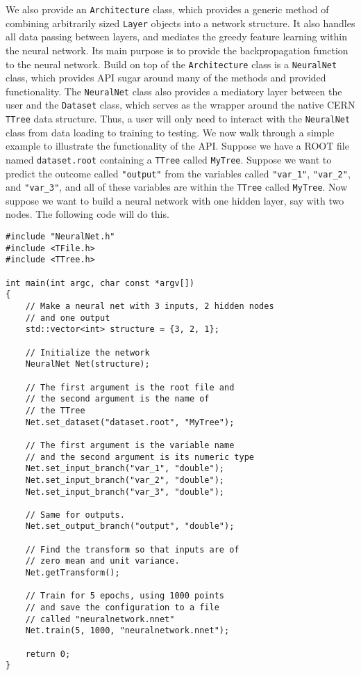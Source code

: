 We also provide an \texttt{Architecture} class, which provides a generic method of combining arbitrarily sized \texttt{Layer} objects into a network structure. It also handles all data passing between layers, and mediates the greedy feature learning within the neural network. Its main purpose is to provide the backpropagation function to the neural network. Build on top of the \texttt{Architecture} class is a \texttt{NeuralNet} class, which provides API sugar around many of the methods and provided functionality. The \texttt{NeuralNet} class also provides a mediatory layer between the user and the \texttt{Dataset} class, which serves as the wrapper around the native CERN \texttt{TTree} data structure. Thus, a user will only need to interact with the \texttt{NeuralNet} class from data loading to training to testing. We now walk through a simple example to illustrate the functionality of the API. Suppose we have a ROOT file named \texttt{dataset.root} containing a \texttt{TTree} called \texttt{MyTree}. Suppose we want to predict the outcome called \texttt{"output"} from the variables called \texttt{"var\_1"}, \texttt{"var\_2"}, and \texttt{"var\_3"}, and all of these variables are within the \texttt{TTree} called \texttt{MyTree}. Now suppose we want to build a neural network with one hidden layer, say with two nodes. The following code will do this. 

\begin{small}
\begin{verbatim}
#include "NeuralNet.h"
#include <TFile.h>
#include <TTree.h>

int main(int argc, char const *argv[])
{
    // Make a neural net with 3 inputs, 2 hidden nodes
    // and one output
    std::vector<int> structure = {3, 2, 1};

    // Initialize the network
    NeuralNet Net(structure);

    // The first argument is the root file and
    // the second argument is the name of 
    // the TTree
    Net.set_dataset("dataset.root", "MyTree");

    // The first argument is the variable name
    // and the second argument is its numeric type
    Net.set_input_branch("var_1", "double");
    Net.set_input_branch("var_2", "double");
    Net.set_input_branch("var_3", "double");

    // Same for outputs.
    Net.set_output_branch("output", "double");

    // Find the transform so that inputs are of
    // zero mean and unit variance.
    Net.getTransform();

    // Train for 5 epochs, using 1000 points
    // and save the configuration to a file
    // called "neuralnetwork.nnet"
    Net.train(5, 1000, "neuralnetwork.nnet");

    return 0;
}

\end{verbatim}
\end{small}

